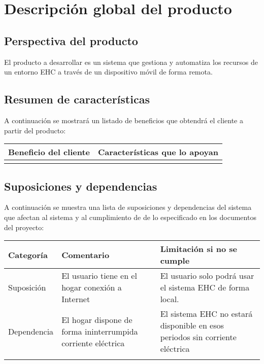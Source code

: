 \chapter{Descripción global del producto}

\section{Perspectiva del producto}
    El producto a desarrollar es un sistema que gestiona y automatiza los recursos de un entorno EHC a través de un dispositivo móvil de forma remota.

\section{Resumen de características}
    A continuación se mostrará un listado de beneficios que obtendrá el cliente a partir del producto: \\ \par
    \begin{tabular}{|p{8cm}|p{8cm}|}
        \hline \textbf{Beneficio del cliente} & \textbf{Características que lo apoyan} \\
        \hline & \\
        \hline
    \end{tabular}

\section{Suposiciones y dependencias}
    A continuación se muestra una lista de suposiciones y dependencias del sistema que afectan al sistema y al cumplimiento de de lo especificado en los documentos del proyecto: \\ \par
    \begin{tabular}{|p{4cm}|p{6cm}|p{6cm}|}
        \hline \textbf{Categoría} &  \textbf{Comentario} & \textbf{Limitación si no se cumple} \\
        \hline Suposición & El usuario tiene en el hogar conexión a Internet & El usuario solo podrá usar el sistema  EHC de forma local. \\
        \hline Dependencia & El hogar dispone de forma ininterrumpida corriente eléctrica & El sistema EHC no estará disponible en esos periodos sin corriente eléctrica \\
        \hline & & \\
        \hline
    \end{tabular}

